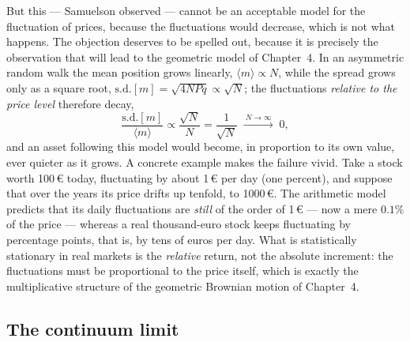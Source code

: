 But this --- Samuelson observed --- cannot be an acceptable model for the fluctuation of prices, because the fluctuations would decrease, which is not what happens.
The objection deserves to be spelled out, because it is precisely the observation that will lead to the geometric model of Chapter~4.
In an asymmetric random walk the mean position grows linearly, $\langle m\rangle \propto N$, while the spread grows only as a square root, $\mathrm{s.d.}[m] = \sqrt{4NPq} \propto \sqrt{N}$; the fluctuations \emph{relative to the price level} therefore decay,
\begin{equation}
\frac{\mathrm{s.d.}[m]}{\langle m\rangle} \propto \frac{\sqrt{N}}{N} = \frac{1}{\sqrt{N}} \;\xrightarrow{\ N\to\infty\ }\; 0,
\end{equation}
and an asset following this model would become, in proportion to its own value, ever quieter as it grows.
A concrete example makes the failure vivid.
Take a stock worth 100\,\euro{} today, fluctuating by about 1\,\euro{} per day (one percent), and suppose that over the years its price drifts up tenfold, to 1000\,\euro.
The arithmetic model predicts that its daily fluctuations are \emph{still} of the order of 1\,\euro{} --- now a mere $0.1\%$ of the price --- whereas a real thousand-euro stock keeps fluctuating by percentage points, that is, by tens of euros per day.
What is statistically stationary in real markets is the \emph{relative} return, not the absolute increment: the fluctuations must be proportional to the price itself, which is exactly the multiplicative structure of the geometric Brownian motion of Chapter~4.

\subsection{The continuum limit}

